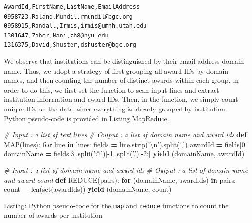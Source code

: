 \documentclass[]{krantz}
\newenvironment{Shaded}{\begin{snugshade}}{\end{snugshade}}
\newcommand{\KeywordTok}[1]{\textcolor[rgb]{0.13,0.29,0.53}{\textbf{#1}}}
\newcommand{\DecValTok}[1]{\textcolor[rgb]{0.00,0.00,0.81}{#1}}
\newcommand{\CharTok}[1]{\textcolor[rgb]{0.31,0.60,0.02}{#1}}
\newcommand{\StringTok}[1]{\textcolor[rgb]{0.31,0.60,0.02}{#1}}
\newcommand{\CommentTok}[1]{\textcolor[rgb]{0.56,0.35,0.01}{\textit{#1}}}
\newcommand{\ControlFlowTok}[1]{\textcolor[rgb]{0.13,0.29,0.53}{\textbf{#1}}}
\newcommand{\OperatorTok}[1]{\textcolor[rgb]{0.81,0.36,0.00}{\textbf{#1}}}
\newcommand{\BuiltInTok}[1]{#1}
\newcommand{\NormalTok}[1]{#1}
\begin{document}
\begin{verbatim}
AwardId,FirstName,LastName,EmailAddress
0958723,Roland,Mundil,rmundil@bgc.org
0958915,Randall,Irmis,irmis@umnh.utah.edu
1301647,Zaher,Hani,zh8@nyu.edu
1316375,David,Shuster,dshuster@bgc.org
\end{verbatim}

We observe that institutions can be distinguished by their email address
domain name. Thus, we adopt a strategy of first grouping all award IDs
by domain names, and then counting the number of distinct awards within
each group. In order to do this, we first set the function to scan input
lines and extract institution information and award IDs. Then, in the
function, we simply count unique IDs on the data, since everything is
already grouped by institution. Python pseudo-code is provided in
Listing \protect\hyperlink{list:parallel1}{MapReduce}.

\begin{Shaded}
\begin{Highlighting}[]
\CommentTok{# Input  : a list of text lines}
\CommentTok{# Output : a list of domain name and award ids}
\KeywordTok{def}\NormalTok{ MAP(lines):}
    \ControlFlowTok{for}\NormalTok{ line }\KeywordTok{in}\NormalTok{ lines:}
\NormalTok{        fields     }\OperatorTok{=}\NormalTok{ line.strip(}\StringTok{'}\CharTok{\textbackslash{}n}\StringTok{'}\NormalTok{).split(}\StringTok{','}\NormalTok{)}
\NormalTok{        awardId    }\OperatorTok{=}\NormalTok{ fields[}\DecValTok{0}\NormalTok{]}
\NormalTok{        domainName }\OperatorTok{=}\NormalTok{ fields[}\DecValTok{3}\NormalTok{].split(}\StringTok{'@'}\NormalTok{)[}\OperatorTok{-}\DecValTok{1}\NormalTok{].split(}\StringTok{'.'}\NormalTok{)[}\OperatorTok{-}\DecValTok{2}\NormalTok{:]}
        \ControlFlowTok{yield}\NormalTok{ (domainName, awardId)}

\CommentTok{# Input  : a list of domain name and award ids}
\CommentTok{# Output : a list of domain name and award count}
\KeywordTok{def}\NormalTok{ REDUCE(pairs):}
    \ControlFlowTok{for}\NormalTok{ (domainName, awardIds) }\KeywordTok{in}\NormalTok{ pairs:}
\NormalTok{        count }\OperatorTok{=} \BuiltInTok{len}\NormalTok{(}\BuiltInTok{set}\NormalTok{(awardIds))}
        \ControlFlowTok{yield}\NormalTok{ (domainName, count)}
\end{Highlighting}
\end{Shaded}

Listing: Python pseudo-code for the \texttt{map} and \texttt{reduce}
functions to count the number of awards per institution
\end{document}
